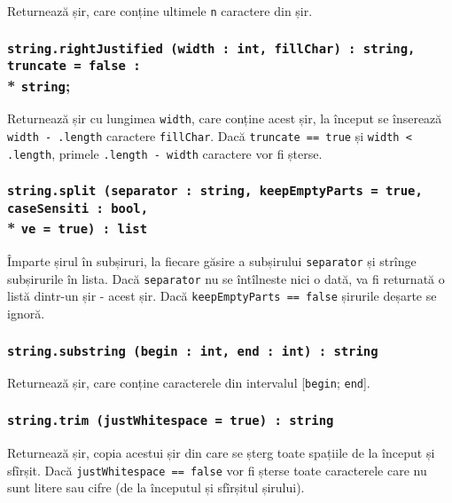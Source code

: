 Returnează șir, care conține ultimele \texttt{n} caractere din șir.

\subsubsection{\texttt{string.rightJustified (width : int, fillChar) : string, truncate = false :}\\* \texttt{string};}

Returnează șir cu lungimea \texttt{width}, care conține acest șir, la început se înserează \texttt{width - .length} caractere \texttt{fillChar}. Dacă \texttt{truncate == true} și \texttt{width < .length}, primele \texttt{.length - width} caractere vor fi șterse.

\subsubsection{\texttt{string.split (separator : string, keepEmptyParts = true, caseSensiti : bool,}\\* \texttt{ve = true) : list}}

Împarte șirul în subșiruri, la fiecare găsire a subșirului \texttt{separator} și strînge subșirurile în lista. Dacă \texttt{separator} nu se întîlneste nici o dată, va fi returnată o listă dintr-un șir - acest șir. Dacă \texttt{keepEmptyParts == false} șirurile deșarte se ignoră.

\subsubsection{\texttt{string.substring (begin : int, end : int) : string}}

Returnează șir, care conține caracterele din intervalul [\texttt{begin}; \texttt{end}].

\subsubsection{\texttt{string.trim (justWhitespace = true) : string}}

Returnează șir, copia acestui șir din care se șterg toate spațiile de la început și sfîrșit. Dacă \texttt{justWhitespace == false} vor fi șterse toate caracterele care nu sunt litere sau cifre (de la începutul și sfîrșitul șirului).


